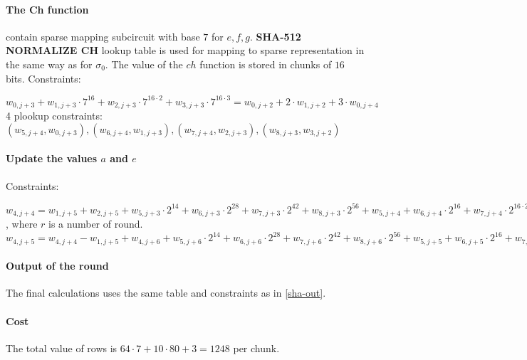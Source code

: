 \paragraph{The Ch function}
contain sparse mapping subcircuit with base $7$ for $e, f ,g$.
\textbf{SHA-512 NORMALIZE CH} lookup table is used for mapping to sparse representation in the same way as for $\sigma_0$.
The value of the $ch$ function is stored in chunks of $16$ bits.
Constraints:
\begin{center}
    $w_{0, j + 3} + w_{1, j + 3} \cdot 7^{16} + w_{2, j + 3} \cdot 7^{16 \cdot 2} + w_{3, j + 3} \cdot 7^{16 \cdot 3} = w_{0, j + 2} + 2 \cdot w_{1, j + 2} + 3 \cdot w_{0, j + 4}$ \\
    4 plookup constraints: $( w_{5, j + 4}, w_{0, j + 3}), ( w_{6, j + 4}, w_{1, j + 3}), (w_{7, j + 4}, w_{2, j + 3}), (w_{8, j + 3}, w_{3, j + 2})$ \\
\end{center}

\paragraph{Update the values $a$ and $e$}
Constraints:
\begin{center}
    $w_{4, j + 4} = w_{1, j + 5} + w_{2, j + 5} + w_{5, j + 3} \cdot 2^{14} + w_{6, j + 3} \cdot  2^{28} + w_{7, j + 3} \cdot 2^{42} + w_{8, j + 3} \cdot 2^{56} + w_{5, j + 4} + w_{6, j + 4} \cdot 2^{16} + w_{7, j + 4} \cdot 2^{16 \cdot 2} + w_{8, j + 4} \cdot 2^{16 \cdot 3} + k[r] + w_{3, j + 5}$, where $r$ is a number of round. \\
    $w_{4, j + 5} = w_{4, j + 4} - w_{1, j + 5} + w_{4, j + 6} + w_{5, j + 6} \cdot 2^{14} + w_{6, j + 6} \cdot  2^{28} + w_{7, j + 6} \cdot 2^{42} + w_{8, j + 6} \cdot 2^{56} + w_{5, j + 5} + w_{6, j + 5} \cdot 2^{16} + w_{7, j + 5} \cdot 2^{16 \cdot 2} + w_{8, j + 5} \cdot 2^{16 \cdot 3}$
\end{center}

\paragraph{Output of the round}
The final calculations uses the same table and constraints as in \ref{sha-out}.

\paragraph{Cost}
The total value of rows is $64 \cdot 7 + 10 \cdot 80 + 3 = 1248$ per chunk.

